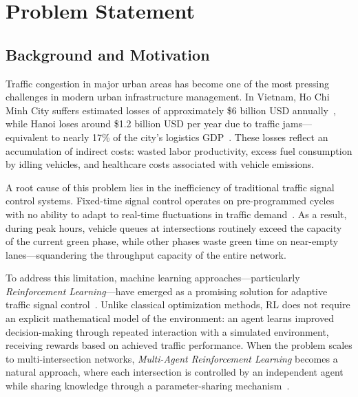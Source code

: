 \chapter{Problem Statement}


\begin{itemize}
    
\end{itemize}

\section{Background and Motivation}

Traffic congestion in major urban areas has become one of the most pressing
challenges in modern urban infrastructure management. In Vietnam, Ho Chi Minh City
suffers estimated losses of approximately \$6 billion USD annually~\cite{hcmc_congestion_2022},
while Hanoi loses around \$1.2 billion USD per year due to traffic
jams---equivalent to nearly 17\% of the city's logistics GDP~\cite{hanoi_congestion_worldbank}.
These losses reflect an accumulation of indirect costs: wasted labor productivity,
excess fuel consumption by idling vehicles, and healthcare costs associated with
vehicle emissions.

A root cause of this problem lies in the inefficiency of traditional traffic signal
control systems. Fixed-time signal control operates on pre-programmed cycles with
no ability to adapt to real-time fluctuations in traffic
demand~\cite{adaptive_signal_survey_2024}. As a result, during peak hours, vehicle
queues at intersections routinely exceed the capacity of the current green phase,
while other phases waste green time on near-empty lanes---squandering the
throughput capacity of the entire network.

To address this limitation, machine learning approaches---particularly
\textit{Reinforcement Learning}---have emerged as a promising solution for
adaptive traffic signal control~\cite{rl_tsc_survey_springer2026,
marl_tsc_sustainability2023}. Unlike classical optimization methods, RL does not
require an explicit mathematical model of the environment: an agent learns improved
decision-making through repeated interaction with a simulated environment, receiving
rewards based on achieved traffic performance. When the problem scales to
multi-intersection networks, \textit{Multi-Agent Reinforcement Learning}
becomes a natural approach, where each intersection is controlled by an independent
agent while sharing knowledge through a parameter-sharing
mechanism~\cite{drl_tsc_survey_sciencedirect2024}.

